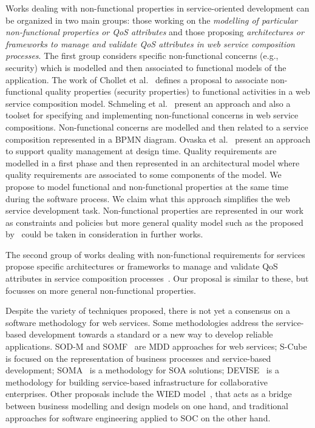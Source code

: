 \documentclass{llncs}
\theoremstyle{plain}
\theoremstyle{plain}
\theoremstyle{plain}
\begin{document}
Works dealing with non-functional properties in service-oriented 
development can be organized in two main groups: those working on the \textit{modelling 
of particular non-functional properties or QoS attributes} and those 
proposing \textit{architectures or frameworks to manage and 
validate QoS attributes in web service composition processes}. 
The first group considers specific non-functional concerns (e.g., security)
which is modelled and then associated to functional models of the application. 
The work of Chollet et al.~\cite{CholletL09} defines a proposal to associate non-functional 
quality properties (security properties) to functional activities in a web service composition model. Schmeling et al.~\cite{SchmelingCM11} present 
an approach and also a toolset for specifying and implementing non-functional 
concerns in web service compositions.
Non-functional concerns are modelled and then related to a service composition 
represented in a BPMN diagram. 
Ovaska et al.~\cite{OvaskaEHPA10} present an approach to 
support quality management at design time. 
Quality requirements are modelled in a first phase and then
represented in an architectural model where quality requirements are associated to some
components of the model. 
We propose to model functional and non-functional properties at the same time during the software process.
We claim what this approach simplifies the web service development task. 
Non-functional properties are represented in our work as constraints and policies 
but more general quality model such as the proposed by~\cite{Goeb2011,Klass2009} 
could be taken in consideration in further works. 


The second group of works dealing with non-functional requirements for services 
propose specific architectures or frameworks to manage and validate 
QoS attributes in service composition processes~\cite{XiaoCZBOLH08,Babamir2010,Karunamurthy2012787}. 
Our proposal is similar to these, but focusses on more general non-functional properties.

Despite the variety of techniques proposed, there is not yet a consensus on a software methodology 
for web services. 
Some methodologies address the service-based 
development towards a standard or a new way to develop reliable applications. 
SOD-M and SOMF~\cite{somf} are MDD approaches for web services; 
S-Cube~\cite{scube2010book} is focused on the representation of business processes and 
service-based development; SOMA~\cite{soma} is a methodology 
for SOA solutions; 
DEVISE~\cite{DEVISE} is a
methodology for building service-based infrastructure for collaborative
enterprises. 
Other proposals include the WIED model~\cite{TongrungrojanaL04}, 
that acts as a bridge between business modelling and design models on one hand, and traditional 
approaches for software engineering applied to SOC on the other hand.
\end{document}
